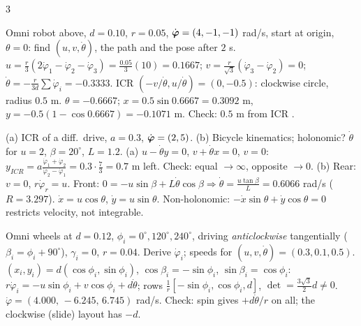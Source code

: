 \begin{multicols}{3}
\begin{examq}
Omni robot above, $d=0.10$, $r=0.05$, $\dot{\boldsymbol\varphi}=(4,-1,-1)$ rad/s, start at origin, $\theta=0$: find $(u,v,\dot\theta)$, the path and the pose after $2$ s.
\solution
$u=\frac r3(2\dot\varphi_1-\dot\varphi_2-\dot\varphi_3)=\frac{0.05}3(10)=0.1667$; $v=\frac r{\sqrt3}(\dot\varphi_3-\dot\varphi_2)=0$; $\dot\theta=-\frac r{3d}\sum\dot\varphi_i=-0.3333$. ICR $(-v/\dot\theta,u/\dot\theta)=(0,-0.5)$: clockwise circle, radius $0.5$ m. $\theta=-0.6667$; $x=0.5\sin0.6667=\boxed{0.3092}$ m, $y=-0.5(1-\cos0.6667)=\boxed{-0.1071}$ m. Check: $0.5$ m from ICR \checkmark. \chk
\end{examq}
\begin{examq}
(a) ICR of a diff.\ drive, $a=0.3$, $\dot{\boldsymbol\varphi}=(2,5)$. (b) Bicycle kinematics; holonomic? $\dot\theta$ for $u=2$, $\beta=20^\circ$, $L=1.2$.
\solution
(a) $u-\dot\theta y=0$, $v+\dot\theta x=0$, $v=0$: $y_{ICR}=a\frac{\dot\varphi_1+\dot\varphi_2}{\dot\varphi_2-\dot\varphi_1}=0.3\cdot\frac73=\boxed{0.7}$ m left. Check: equal $\to\infty$, opposite $\to0$.
(b) Rear: $v=0$, $r\dot\varphi_r=u$. Front: $0=-u\sin\beta+L\dot\theta\cos\beta\Rightarrow\dot\theta=\frac{u\tan\beta}L=\boxed{0.6066}$ rad/s ($R=3.297$). $\dot x=u\cos\theta$, $\dot y=u\sin\theta$. Non-holonomic: $-\dot x\sin\theta+\dot y\cos\theta=0$ restricts velocity, not integrable. \chk
\end{examq}
\begin{examq}
Omni wheels at $d=0.12$, $\phi_i=0^\circ,120^\circ,240^\circ$, driving \emph{anticlockwise} tangentially ($\beta_i=\phi_i+90^\circ$), $\gamma_i=0$, $r=0.04$. Derive $\dot\varphi_i$; speeds for $(u,v,\dot\theta)=(0.3,0.1,0.5)$.
\solution
$(x_i,y_i)=d(\cos\phi_i,\sin\phi_i)$, $\cos\beta_i=-\sin\phi_i$, $\sin\beta_i=\cos\phi_i$: $r\dot\varphi_i=-u\sin\phi_i+v\cos\phi_i+d\dot\theta$; rows $\frac1r[-\sin\phi_i,\cos\phi_i,d]$, $\det=\frac{3\sqrt3}2d\ne0$. $\dot\varphi=\boxed{(4.000,\,-6.245,\,6.745)}$ rad/s. Check: spin gives $+d\dot\theta/r$ on all; the clockwise (slide) layout has $-d$. \chk
\end{examq}
\end{multicols}
